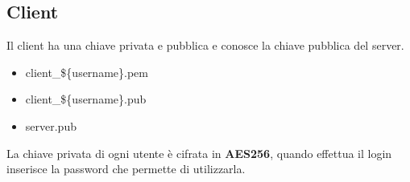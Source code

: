 \documentclass[a4paper,titlepage]{article}
\begin{document}
\subsection{Client}
Il client ha una chiave privata e pubblica e conosce la chiave pubblica del server.
\begin{itemize}
\item client\_\$\{username\}.pem
\item client\_\$\{username\}.pub
\item server.pub
\end{itemize}
La chiave privata di ogni utente è cifrata in \textbf{AES256}, quando effettua il login inserisce la password che permette di utilizzarla.

\end{document}
